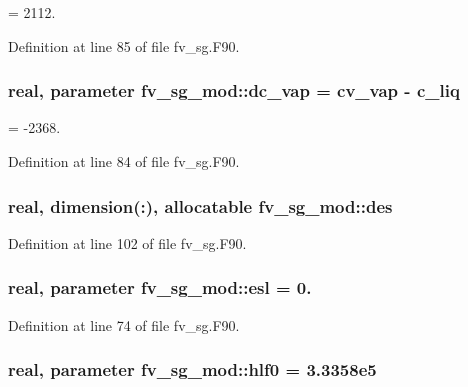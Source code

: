 = 2112. 



Definition at line 85 of file fv\-\_\-sg.\-F90.

\subsubsection[{dc\-\_\-vap}]{\setlength{\rightskip}{0pt plus 5cm}real, parameter fv\-\_\-sg\-\_\-mod\-::dc\-\_\-vap = {\bf cv\-\_\-vap} -\/ {\bf c\-\_\-liq}\hspace{0.3cm}{\ttfamily [private]}}\label{classfv__sg__mod_a801d775ff0bd22525d3bdbfdbaa25a93}


= -\/2368. 



Definition at line 84 of file fv\-\_\-sg.\-F90.

\subsubsection[{des}]{\setlength{\rightskip}{0pt plus 5cm}real, dimension(\-:), allocatable fv\-\_\-sg\-\_\-mod\-::des\hspace{0.3cm}{\ttfamily [private]}}\label{classfv__sg__mod_a3d64c11d4c5914570d3d22b46f4c9d96}


Definition at line 102 of file fv\-\_\-sg.\-F90.

\subsubsection[{esl}]{\setlength{\rightskip}{0pt plus 5cm}real, parameter fv\-\_\-sg\-\_\-mod\-::esl = 0.\hspace{0.3cm}{\ttfamily [private]}}\label{classfv__sg__mod_af4058b7b266d23d4f30e73514cd0d403}


Definition at line 74 of file fv\-\_\-sg.\-F90.

\subsubsection[{hlf0}]{\setlength{\rightskip}{0pt plus 5cm}real, parameter fv\-\_\-sg\-\_\-mod\-::hlf0 = 3.\-3358e5\hspace{0.3cm}{\ttfamily [private]}}\label{classfv__sg__mod_a0ef6edb91d65d124d913ef57e02e588c}


